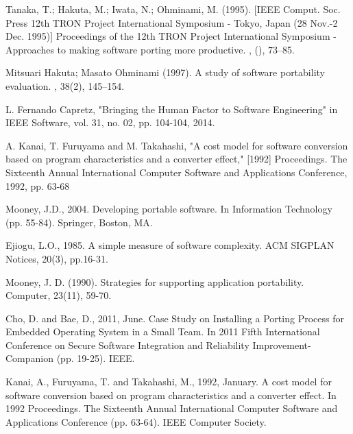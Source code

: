 \begin{flushleft}
    \begin{thebibliography}{99}

     Tanaka, T.; Hakuta, M.; Iwata, N.; Ohminami, M. (1995). [IEEE Comput. Soc. Press 12th TRON Project International Symposium - Tokyo, Japan (28 Nov.-2 Dec. 1995)] Proceedings of the 12th TRON Project International Symposium - Approaches to making software porting more productive. , (), 73–85.

     Mitsuari Hakuta; Masato Ohminami (1997). A study of software portability evaluation. , 38(2), 145–154.

     L. Fernando Capretz, "Bringing the Human Factor to Software Engineering" in IEEE Software, vol. 31, no. 02, pp. 104-104, 2014.

     A. Kanai, T. Furuyama and M. Takahashi, "A cost model for software conversion based on program characteristics and a converter effect," [1992] Proceedings. The Sixteenth Annual International Computer Software and Applications Conference, 1992, pp. 63-68

     Mooney, J.D., 2004. Developing portable software. In Information Technology (pp. 55-84). Springer, Boston, MA.

     Ejiogu, L.O., 1985. A simple measure of software complexity. ACM SIGPLAN Notices, 20(3), pp.16-31.

     Mooney, J. D. (1990). Strategies for supporting application portability. Computer, 23(11), 59-70.

     Cho, D. and Bae, D., 2011, June. Case Study on Installing a Porting Process for Embedded Operating System in a Small Team. In 2011 Fifth International Conference on Secure Software Integration and Reliability Improvement-Companion (pp. 19-25). IEEE.

     Kanai, A., Furuyama, T. and Takahashi, M., 1992, January. A cost model for software conversion based on program characteristics and a converter effect. In 1992 Proceedings. The Sixteenth Annual International Computer Software and Applications Conference (pp. 63-64). IEEE Computer Society.

    \end{thebibliography}
\end{flushleft}
